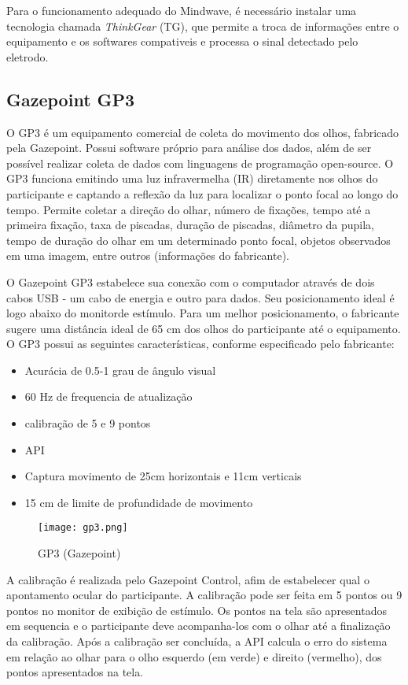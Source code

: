 Para o funcionamento adequado do Mindwave, é necessário instalar uma tecnologia 
chamada \textit{ThinkGear} (TG), que permite a troca de informações entre o equipamento 
e os softwares compativeis e processa o sinal detectado pelo eletrodo. 


\subsection{Gazepoint GP3}

O GP3 é um equipamento comercial de coleta do movimento dos olhos, 
fabricado pela Gazepoint. Possui software próprio para análise dos dados, 
além de ser possível realizar coleta de dados com linguagens de programação open-source. O GP3 funciona emitindo uma luz infravermelha (IR) 
diretamente nos olhos do participante e captando a reflexão da luz para localizar o ponto focal ao longo do tempo. 
Permite coletar a direção do olhar, número de fixações, tempo até a primeira fixação, taxa de piscadas,
 duração de piscadas, diâmetro da pupila, tempo de duração do olhar em um determinado ponto focal, 
 objetos observados em uma imagem, entre outros (informações do fabricante).

O Gazepoint GP3 estabelece sua conexão com o computador através de dois cabos USB - um cabo de energia e outro para dados.
Seu posicionamento ideal é logo abaixo do monitorde estímulo. Para um melhor posicionamento, o fabricante 
sugere uma distância ideal de 65 cm dos olhos do participante até o equipamento. O GP3 possui as seguintes características, conforme
especificado pelo fabricante:

\begin{itemize}
    \item Acurácia de 0.5-1 grau de ângulo visual
    \item 60 Hz de frequencia de atualização
    \item calibração de 5 e 9 pontos
    \item API
    \item Captura movimento de 25cm horizontais e 11cm verticais
    \item 15 cm de limite de profundidade de movimento
\end{itemize}

\begin{figure}
    \centering
    \texttt{[image: gp3.png]}
    \caption{GP3 (Gazepoint)}
\end{figure}

A calibração é realizada pelo Gazepoint Control, afim de estabelecer qual o apontamento ocular do participante. 
A calibração pode ser feita em 5 pontos ou 9 pontos no monitor de exibição de estímulo. Os pontos na tela são apresentados
em sequencia e o participante deve acompanha-los com o olhar até a finalização da calibração. Após a calibração ser concluída, a API calcula o erro do sistema em relação ao olhar para o olho esquerdo (em verde) 
e direito (vermelho), dos pontos apresentados na tela. 

